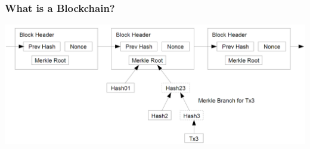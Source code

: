 \documentclass[notitlepage, usenames,dvipsnames]{beamer}
\begin{document}
    \begin{frame}
        \frametitle{What is a Blockchain?}

        \begin{overlayarea}{\textwidth}{\textheight}

            \vspace{4ex}

             {
            }

             {
            \vspace{4ex}
            \includegraphics[scale=0.26]{../img/block-chain.png}
            }

        \end{overlayarea}
    \end{frame}
\end{document}
